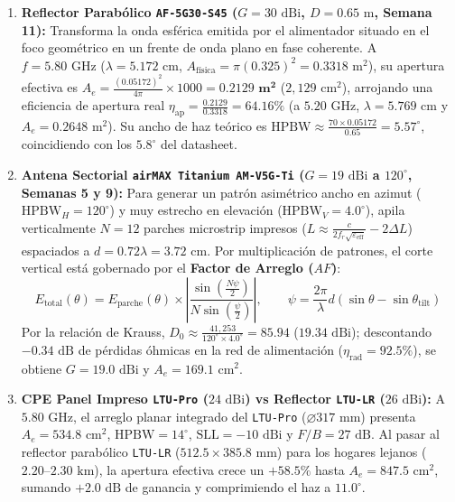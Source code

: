 \documentclass[10pt,letterpaper]{article}
\begin{document}
\begin{enumerate}
    \item \textbf{Reflector Parabólico \texttt{AF-5G30-S45} ($G = 30\text{ dBi}$, $D = 0.65\text{ m}$, Semana 11):} Transforma la onda esférica emitida por el alimentador situado en el foco geométrico en un frente de onda plano en fase coherente. A $f = 5.80\text{ GHz}$ ($\lambda = 5.172\text{ cm}$, $A_{\text{física}} = \pi(0.325)^2 = 0.3318\text{ m}^2$), su apertura efectiva es $A_e = \frac{(0.05172)^2}{4\pi}\times 1000 = \mathbf{0.2129\text{ m}^2}$ ($2,129\text{ cm}^2$), arrojando una eficiencia de apertura real $\eta_{\text{ap}} = \frac{0.2129}{0.3318} = \mathbf{64.16\%}$ (a $5.20\text{ GHz}$, $\lambda = 5.769\text{ cm}$ y $A_e = 0.2648\text{ m}^2$). Su ancho de haz teórico es $\text{HPBW} \approx \frac{70 \times 0.05172}{0.65} = 5.57^\circ$, coincidiendo con los $5.8^\circ$ del datasheet.
    \item \textbf{Antena Sectorial \texttt{airMAX Titanium AM-V5G-Ti} ($G = 19\text{ dBi}$ a $120^\circ$, Semanas 5 y 9):} Para generar un patrón asimétrico ancho en azimut ($\text{HPBW}_H = 120^\circ$) y muy estrecho en elevación ($\text{HPBW}_V = 4.0^\circ$), apila verticalmente $N = 12$ parches microstrip impresos ($L \approx \frac{c}{2f_r\sqrt{\varepsilon_{\text{eff}}}} - 2\Delta L$) espaciados a $d = 0.72\lambda = 3.72\text{ cm}$. Por multiplicación de patrones, el corte vertical está gobernado por el \textbf{Factor de Arreglo ($AF$)}:
    \begin{equation}
        E_{\text{total}}(\theta) = E_{\text{parche}}(\theta) \times \left| \frac{\sin\left(\frac{N\psi}{2}\right)}{N\sin\left(\frac{\psi}{2}\right)} \right|, \qquad \psi = \frac{2\pi}{\lambda} d (\sin\theta - \sin\theta_{\text{tilt}})
        \label{eq:factor_arreglo}
    \end{equation}
    Por la relación de Krauss, $D_0 \approx \frac{41,253}{120^\circ \times 4.0^\circ} = 85.94$ ($19.34\text{ dBi}$); descontando $-0.34\text{ dB}$ de pérdidas óhmicas en la red de alimentación ($\eta_{\text{rad}} = 92.5\%$), se obtiene $G = 19.0\text{ dBi}$ y $A_e = 169.1\text{ cm}^2$.
    \item \textbf{CPE Panel Impreso \texttt{LTU-Pro} ($24\text{ dBi}$) vs Reflector \texttt{LTU-LR} ($26\text{ dBi}$):} A $5.80\text{ GHz}$, el arreglo planar integrado del \texttt{LTU-Pro} ($\varnothing 317\text{ mm}$) presenta $A_e = 534.8\text{ cm}^2$, $\text{HPBW} = 14^\circ$, $\text{SLL} = -10\text{ dBi}$ y $F/B = 27\text{ dB}$. Al pasar al reflector parabólico \texttt{LTU-LR} ($512.5 \times 385.8\text{ mm}$) para los hogares lejanos ($2.20\text{--}2.30\text{ km}$), la apertura efectiva crece un $+58.5\%$ hasta $A_e = 847.5\text{ cm}^2$, sumando $+2.0\text{ dB}$ de ganancia y comprimiendo el haz a $11.0^\circ$.

\end{enumerate}
\end{document}
